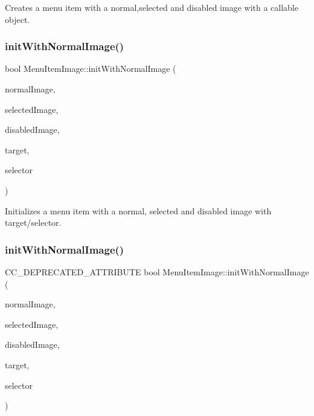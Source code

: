 Creates a menu item with a normal,selected and disabled image with a callable object. \mbox{\label{classMenuItemImage_a9b48219252d0b4c138b9bda8c1d812c4}} 
\subsubsection{\texorpdfstring{init\+With\+Normal\+Image()}{initWithNormalImage()}\hspace{0.1cm}{\footnotesize\ttfamily [1/4]}}
{\footnotesize\ttfamily bool Menu\+Item\+Image\+::init\+With\+Normal\+Image (\begin{DoxyParamCaption}\item[{const std\+::string \&}]{normal\+Image,  }\item[{const std\+::string \&}]{selected\+Image,  }\item[{const std\+::string \&}]{disabled\+Image,  }\item[{\hyperlink{classRef}{Ref} $\ast$}]{target,  }\item[{S\+E\+L\+\_\+\+Menu\+Handler}]{selector }\end{DoxyParamCaption})}

Initializes a menu item with a normal, selected and disabled image with target/selector. \mbox{\label{classMenuItemImage_a1676374a1960c737c5bca1411ea66b4e}} 
\subsubsection{\texorpdfstring{init\+With\+Normal\+Image()}{initWithNormalImage()}\hspace{0.1cm}{\footnotesize\ttfamily [2/4]}}
{\footnotesize\ttfamily C\+C\+\_\+\+D\+E\+P\+R\+E\+C\+A\+T\+E\+D\+\_\+\+A\+T\+T\+R\+I\+B\+U\+TE bool Menu\+Item\+Image\+::init\+With\+Normal\+Image (\begin{DoxyParamCaption}\item[{const std\+::string \&}]{normal\+Image,  }\item[{const std\+::string \&}]{selected\+Image,  }\item[{const std\+::string \&}]{disabled\+Image,  }\item[{\hyperlink{classRef}{Ref} $\ast$}]{target,  }\item[{S\+E\+L\+\_\+\+Menu\+Handler}]{selector }\end{DoxyParamCaption})}

